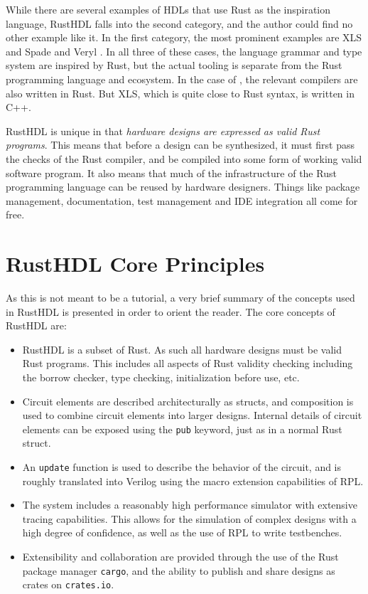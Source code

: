 \documentclass[conference]{IEEEtran}
\begin{document}
While there are several examples of HDLs that use Rust as the inspiration language, RustHDL falls 
into the second category, and the author could find no other example like it.  In the 
first category, the most prominent examples are XLS \cite{b4} and Spade \cite{b1} and Veryl \cite{b5}.  
In all three of these cases, the language grammar and type system are inspired by Rust, but 
the actual tooling is separate from the Rust programming language and ecosystem.  In the case of 
\cite{b1, b5}, the relevant compilers are also written in Rust.  But XLS, which is quite close to 
Rust syntax, is written in C++.

RustHDL is unique in that \emph{hardware designs are expressed as valid Rust programs}.
This means that before a design can be synthesized, it must first pass the checks of the Rust
compiler, and be compiled into some form of working valid software program.
It also means that much of the infrastructure of the Rust programming language can be reused
by hardware designers.  Things like package management, documentation, test management and IDE 
integration all come for free.

\section{RustHDL Core Principles}\label{sec:core}

As this is not meant to be a tutorial, a very brief summary of the concepts used in RustHDL is presented
in order to orient the reader.  The core concepts of RustHDL are:

\begin{itemize}
  \item RustHDL is a subset of Rust.  As such all hardware designs must be valid Rust programs.  This includes
  all aspects of Rust validity checking including the borrow checker, type checking, initialization before 
  use, etc.
  \item Circuit elements are described architecturally as structs, and composition is used to combine 
  circuit elements into larger designs. Internal details of circuit elements can be exposed using the 
  \verb|pub| keyword, just as in a normal Rust struct.
  \item An \verb|update| function is used to describe the behavior of the circuit, and is roughly
  translated into Verilog using the macro extension capabilities of RPL.
  \item The system includes a reasonably high performance simulator with extensive tracing capabilities.
  This allows for the simulation of complex designs with a high degree of confidence, as well as 
  the use of RPL to write testbenches.
  \item Extensibility and collaboration are provided through the use of the Rust package manager \verb|cargo|, and 
  the ability to publish and share designs as crates on \verb|crates.io|.
\end{itemize}
\end{document}
